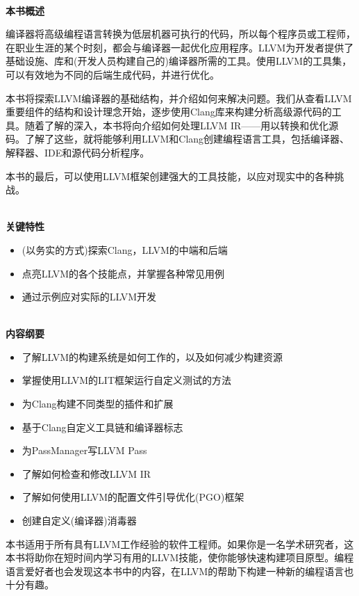 \documentclass[11pt,a4paper,UTF8]{ctexart}
\begin{document}
	\hspace*{\fill} \\ %
	\noindent\textbf{本书概述}
	
	编译器将高级编程语言转换为低层机器可执行的代码，所以每个程序员或工程师，在职业生涯的某个时刻，都会与编译器一起优化应用程序。LLVM为开发者提供了基础设施、库和(开发人员构建自己的)编译器所需的工具。使用LLVM的工具集，可以有效地为不同的后端生成代码，并进行优化。
	
	本书将探索LLVM编译器的基础结构，并介绍如何来解决问题。我们从查看LLVM重要组件的结构和设计理念开始，逐步使用Clang库来构建分析高级源代码的工具。随着了解的深入，本书将向介绍如何处理LLVM IR——用以转换和优化源码。了解了这些，就将能够利用LLVM和Clang创建编程语言工具，包括编译器、解释器、IDE和源代码分析程序。
	
	本书的最后，可以使用LLVM框架创建强大的工具技能，以应对现实中的各种挑战。
	
	\hspace*{\fill} \\ %
	\noindent\textbf{关键特性}
	\begin{itemize}
		\item (以务实的方式)探索Clang，LLVM的中端和后端
		\item 点亮LLVM的各个技能点，并掌握各种常见用例
		\item 通过示例应对实际的LLVM开发
	\end{itemize}

	\hspace*{\fill} \\ %
	\noindent\textbf{内容纲要}
	\begin{itemize}
		\item 了解LLVM的构建系统是如何工作的，以及如何减少构建资源
		\item 掌握使用LLVM的LIT框架运行自定义测试的方法
		\item 为Clang构建不同类型的插件和扩展
		\item 基于Clang自定义工具链和编译器标志
		\item 为PassManager写LLVM Pass
		\item 了解如何检查和修改LLVM IR
		\item 了解如何使用LLVM的配置文件引导优化(PGO)框架
		\item 创建自定义(编译器)消毒器
	\end{itemize}

	本书适用于所有具有LLVM工作经验的软件工程师。如果你是一名学术研究者，这本书将助你在短时间内学习有用的LLVM技能，使你能够快速构建项目原型。编程语言爱好者也会发现这本书中的内容，在LLVM的帮助下构建一种新的编程语言也十分有趣。
	
\end{document}
